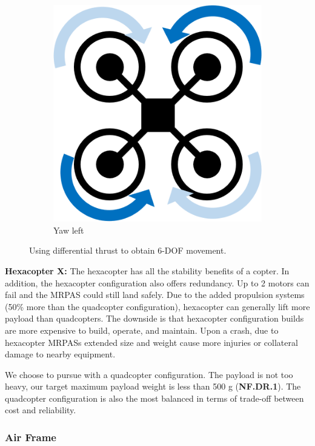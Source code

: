 \begin{figure}[H]
\begin{subfigure}[b]{0.3\textwidth}
    \end{subfigure}
    ~
    \begin{subfigure}[b]{0.3\textwidth}
        \centering
        \includegraphics[scale=0.4]{img/drone_x_yaw}
        \caption{Yaw left}
        \label{fig:x-yaw}
    \end{subfigure}
    
    \caption{Using differential thrust to obtain 6-DOF movement. }
    \label{fig:rpas_6dof}
\end{figure}

\textbf{Hexacopter X: }
The hexacopter has all the stability benefits of a copter. In addition, the hexacopter configuration also 
offers redundancy. Up to 2 motors can fail and the MRPAS could still land safely. Due to the added 
propulsion systems (50\% more than the quadcopter configuration), hexacopter can generally lift more 
payload than quadcopters. The downside is that hexacopter configuration builds are more expensive to build, 
operate, and maintain. Upon a crash, due to hexacopter MRPASs extended size and weight cause more injuries 
or collateral damage to nearby equipment.

We choose to pursue with a quadcopter configuration. 
The payload is not too heavy, our target maximum payload weight is less than 500 g (\textbf{NF.DR.1}). The quadcopter configuration is also the most balanced in terms of trade-off between cost and reliability. 

\subsubsection{Air Frame}\label{section:air-frame}

